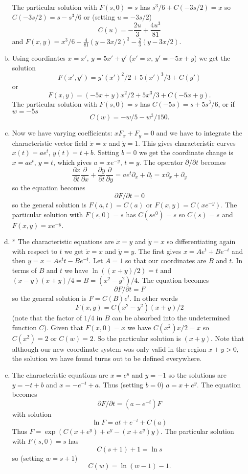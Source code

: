 \documentclass[12pt]{article}
\begin{document}
\begin{answer}
\begin{enumerate}[(a)]
The particular solution with $F(s,0)=s$ has $s^3/6+C(-3s/2)=x$ so $C(-3s/2)=s-s^3/6$ or (setting $u=-3s/2$)
\[C(u)=-\frac{2u}{3}+\frac{4u^3}{81}\]
and $F(x,y)=x^3/6+\frac{4}{81}(y-3x/2)^3-\frac{2}{3}(y-3x/2)$.
\item Using coordinates $x=x'$, $y=5x'+y'$ ($x'=x$, $y'=-5x+y$) we get the solution
\[F(x',y')=y'(x')^2/2+5(x')^3/3+C(y')\]
or
\[F(x,y)=(-5x+y)x^2/2+5x^3/3+C(-5x+y).\]
The particular solution with $F(s,0)=s$ has $C(-5s)=s+5s^3/6$, or if $w=-5s$
\[C(w)=-w/5-w^3/150.\]
\item Now we have varying coefficients: $xF_x+F_y=0$ and we have to integrate the characteristic vector field $\dot{x}=x$ and $\dot{y}=1$. This gives characteristic curves $x(t)=ae^t$, $y(t)=t+b$. Setting $b=0$ we get the coordinate change is $x=ae^t$, $y=t$, which gives $a=xe^{-y}$, $t=y$. The operator $\partial/\partial t$ becomes
\[\frac{\partial x}{\partial t}\frac{\partial}{\partial x}+\frac{\partial y}{\partial t}\frac{\partial}{\partial y}=ae^t\partial_x+\partial_t=x\partial_x+\partial_y\]
so the equation becomes
\[\partial F/\partial t=0\]
so the general solution is $F(a,t)=C(a)$ or $F(x,y)=C(xe^{-y})$. The particular solution with $F(s,0)=s$ has $C(se^0)=s$ so $C(s)=s$ and $F(x,y)=xe^{-y}$.
\item * The characteristic equations are $\dot{x}=y$ and $\dot{y}=x$ so differentiating again with respect to $t$ we get $\ddot{x}=x$ and $\ddot{y}=y$. The first gives $x=Ae^t+Be^{-t}$ and then $y=\dot{x}=Ae^t t-Be^{-t}$.
Let $A=1$ so that our coordinates are $B$ and $t$. In terms of $B$ and $t$ we have $\ln((x+y)/2)=t$ and $(x-y)(x+y)/4=B=(x^2-y^2)/4$.
The equation becomes
\[\partial F/\partial t=F\]
so the general solution is $F=C(B)e^t$.
In other words
\[F(x,y)=C(x^2-y^2)(x+y)/2\]
(note that the factor of $1/4$ in $B$ can be absorbed into the undetermined function $C$). Given that $F(x,0)=x$ we have $C(x^2)x/2=x$ so $C(x^2)=2$ or $C(w)=2$. So the particular solution is $(x+y)$.
Note that although our new coordinate system was only valid in the region $x+y>0$, the solution we have found turns out to be defined everywhere.
\item The characteristic equations are $\dot{x}=e^y$ and $\dot{y}=-1$ so the solutions are $y=-t+b$ and $x=-e^{-t}+a$. Thus (setting $b=0$) $a=x+e^{y}$. The equation becomes
\[\partial F/\partial t=(a-e^{-t})F\]
with solution
\[\ln F=at+e^{-t}+C(a)\]
Thus $F=\exp(C(x+e^{y})+e^y-(x+e^y)y)$. The particular solution with $F(s,0)=s$ has
\[C(s+1)+1=\ln s\]
so (setting $w=s+1$)
\[C(w)=\ln(w-1)-1.\]
\end{enumerate}
\end{answer}
\newpage
\end{document}
